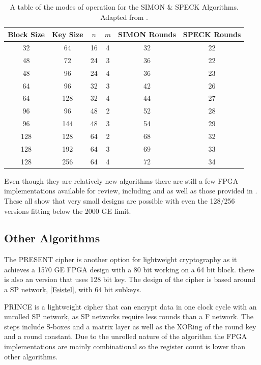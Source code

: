 \documentclass[12pt,twoside,a4paper]{report}
\begin{document}
        \begin{table}[H]
        \centering
        \begin{tabular}{||c|c|c|c|c|c||}
            \hline \hline
            Block Size & Key Size & $n$ & $m$ & SIMON Rounds & SPECK Rounds \\
            \hline \hline
            32 & 64 & 16 & 4 & 32 & 22 \\
            \hline
            48 & 72 & 24 & 3 & 36 & 22 \\
            48 & 96 & 24 & 4 & 36 & 23 \\
            \hline
            64 & 96 & 32 & 3 & 42 & 26 \\
            64 & 128 & 32 & 4 & 44 & 27 \\
            \hline
            96 & 96 & 48 & 2 & 52 & 28 \\
            96 & 144 & 48 & 3 & 54 & 29 \\
            \hline
            128 & 128 & 64 & 2 & 68 & 32 \\
            128 & 192 & 64 & 3 & 69 & 33 \\
            128 & 256 & 64 & 4 & 72 & 34 \\
            \hline \hline
        \end{tabular}
        \caption{A table of the modes of operation for the SIMON \& SPECK Algorithms. Adapted from \cite{Beaulieu2015}.}
        \label{table:S+S}
        \end{table}    
    
    Even though they are relatively new algorithms there are still a few FPGA implementations available for review, including \cite{Aysu2014} and \cite{Shahverdi2015} as well as those provided in \cite{Beaulieu2013}. These all show that very small designs are possible with even the 128/256 versions fitting below the 2000 GE limit.
    
    \subsection{Other Algorithms}
    The PRESENT cipher is another option for lightweight cryptography as it achieves a 1570 GE FPGA design with a 80 bit working on a 64 bit block. there is also an version that uses 128 bit key. The design of the cipher is based around a SP network, \autoref{Feistel}, with 64 bit subkeys.
    
    PRINCE is a lightweight cipher that can encrypt data in one clock cycle with an unrolled SP network, as SP networks require less rounds than a F network. The steps include S-boxes and a matrix layer as well as the XORing of the round key and a round constant. Due to the unrolled nature of the algorithm the FPGA implementations are mainly combinational so the register count is lower than other algorithms.
    
\end{document}
